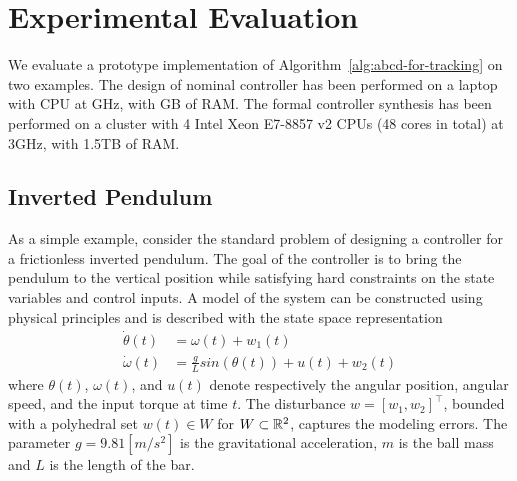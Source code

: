 
\section{Experimental Evaluation}\label{sec:experiments}
We evaluate a prototype implementation of Algorithm~\ref{alg:abcd-for-tracking}
on two examples. 
The design of nominal controller has been performed on a laptop with  CPU at GHz, with GB of
RAM.
The formal controller synthesis has been performed
on a cluster with 4 Intel Xeon E7-8857 v2 CPUs (48 cores in total) at 3GHz, with 1.5TB of
RAM.
\subsection{Inverted Pendulum}\label{subsec:invpend}
As a simple example, consider the standard problem of designing a controller for a frictionless inverted pendulum.
The goal of the controller is to bring the pendulum to the vertical position while satisfying hard constraints on the state variables and control inputs.
A model of the system can be constructed using physical principles and is described with the state space representation
\begin{align*}\label{eq:inv_pend_ss}
\dot\theta(t)&=\omega(t)+w_1(t)\nonumber\\
\dot\omega(t)&=\frac{g}{L}sin(\theta(t))+u(t)+w_2(t)
\end{align*}
where $\theta(t)$, $\omega(t)$, and $u(t)$ denote respectively the angular position, angular speed, 
and the input torque at time $t$. The disturbance $w=[w_1,w_2]^\top$, bounded with a polyhedral set $w(t)\in W$ for $W\subset\mathbb{R}^2$, captures the modeling errors. 
The parameter $g=9.81 [m/s^2]$ is the gravitational acceleration, $m$ is the ball mass
and $L$ is the length of the bar. 

